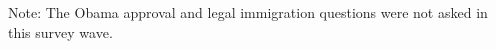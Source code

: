 \begin{table}[htbp]
\begin{threeparttable}[b]
      \begin{tablenotes}\item Note: The Obama approval and legal immigration questions were not asked in this survey wave.
      \end{tablenotes}
   \end{threeparttable}
\end{table}


